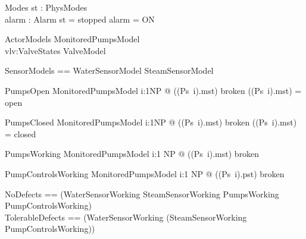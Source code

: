 \begin{schema}{Modes}  
       st : PhysModes\\
       alarm : Alarm
\where
       st = stopped \implies alarm = ON
\end{schema}




\begin{schema}{ActorModels} 
  MonitoredPumpsModel\\
  vlv:ValveStates 
\where 
  ValveModel
\end{schema}

\begin{zed}
SensorModels == WaterSensorModel \land SteamSensorModel                          
\end{zed}       

%
%

\begin{schema}{PumpsOpen}
     MonitoredPumpsModel
\where  \forall i:1\upto NP @ ((Ps~i).mst) \neq broken \implies ((Ps~i).mst) = open
\end{schema}

\begin{schema}{ PumpsClosed}
     MonitoredPumpsModel   
\where  \forall i:1\upto NP @ ((Ps~i).mst) \neq broken 
                        \implies ((Ps~i).mst) = closed
\end{schema}

  
\begin{schema}{PumpsWorking}  
      MonitoredPumpsModel
\where  \forall i:1 \upto NP @ ((Ps~i).mst) \neq broken
\end{schema}


\begin{schema}{PumpControlsWorking}
      MonitoredPumpsModel
\where  \forall i:1 \upto NP @ ((Ps~i).pst) \neq broken
\end{schema}
   
\begin{zed}  
NoDefects       == (WaterSensorWorking \land SteamSensorWorking \land 
                     PumpsWorking       \land PumpControlsWorking)                                   
\\
TolerableDefects == (WaterSensorWorking \lor 
                     (SteamSensorWorking \land PumpControlsWorking))
\end{zed}  

